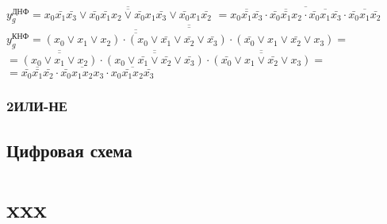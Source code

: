 \documentclass{bmstu}
\begin{document}
	$y^{\text{ДНФ}}_g = \overline{\overline{x_0 \bar{x_1} \bar{x_3} \vee \bar{x_0} \bar{x_1} x_2 \vee \bar{x_0} x_1 \bar{x_3} \vee \bar{x_0} x_1 \bar{x_2}}}$
	$= \overline{\overline{x_0 \bar{x_1} \bar{x_3}} \cdot \overline{\bar{x_0} \bar{x_1} x_2} \cdot \overline{\bar{x_0} x_1 \bar{x_3}} \cdot \overline{\bar{x_0} x_1 \bar{x_2}}}$ \\
	$y^{\text{КНФ}}_g = \overline{\overline{\overline{\overline{(x_0 \vee x_1 \vee x_2) \cdot (x_0 \vee \bar{x_1} \vee \bar{x_2} \vee \bar{x_3})}} \cdot (\bar{x_0} \vee x_1 \vee \bar{x_2} \vee x_3)}} =$ \\
	$= \overline{\overline{(x_0 \vee x_1 \vee x_2)}} \cdot \overline{\overline{(x_0 \vee \bar{x_1} \vee \bar{x_2} \vee \bar{x_3})}} \cdot \overline{\overline{(\bar{x_0} \vee x_1 \vee \bar{x_2} \vee x_3)}} =$ \\
	$= \overline{\bar{x_0} \bar{x_1} \bar{x_2}} \cdot \overline{\bar{x_0} x_1 x_2 x_3} \cdot \overline{x_0 \bar{x_1} x_2 \bar{x_3}}$ \\
	
	
	\subsection{2ИЛИ-НЕ}
	
	\section{Цифровая схема}
	\chapter{xxx}
	
	
	
	
	
\end{document}
